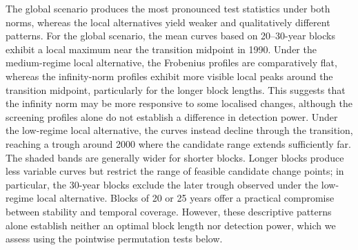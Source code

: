 \documentclass[APA,STIX1COL]{WileyNJD-v2}
\begin{document}
The global scenario produces the most pronounced test statistics under both norms, whereas the local alternatives yield weaker and qualitatively different patterns.
For the global scenario, the mean curves based on 20--30-year blocks exhibit a local maximum near the transition midpoint in 1990.
Under the medium-regime local alternative, the Frobenius profiles are comparatively flat, whereas the infinity-norm profiles exhibit more visible local peaks around the transition midpoint, particularly for the longer block lengths.
This suggests that the infinity norm may be more responsive to some localised changes, although the screening profiles alone do not establish a difference in detection power.
Under the low-regime local alternative, the curves instead decline through the transition, reaching a trough around 2000 where the candidate range extends sufficiently far.
The shaded bands are generally wider for shorter blocks.
Longer blocks produce less variable curves but restrict the range of feasible candidate change points; in particular, the 30-year blocks exclude the later trough observed under the low-regime local alternative.
Blocks of 20 or 25 years offer a practical compromise between stability and temporal coverage.
However, these descriptive patterns alone establish neither an optimal block length nor detection power, which we assess using the pointwise permutation tests below.
\end{document}

